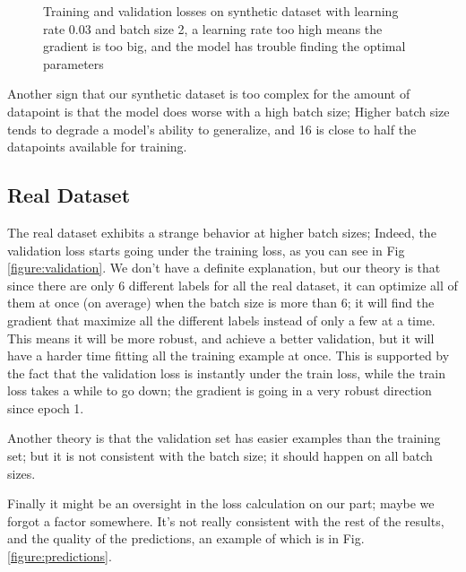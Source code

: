 \documentclass[10pt,conference]{IEEEtran}
\begin{document}
\begin{figure}[h]
\begin{minipage}[h]{0.23\textwidth}
    \caption{Training and validation losses on synthetic dataset with learning rate 0.03 and batch size 2, a learning rate too high means the gradient is too big, and the model has trouble finding the optimal parameters}
    \label{figure:highlr}
  \end{minipage}
\end{figure}

Another sign that our synthetic dataset is too complex for the amount of datapoint is that the model does worse with a high batch size; Higher batch size tends to degrade a model's ability to generalize, and 16 is close to half the datapoints available for training.
\subsection{Real Dataset}
The real dataset exhibits a strange behavior at higher batch sizes; Indeed, the validation loss starts going under the training loss, as you can see in Fig \ref{figure:validation}. We don't have a definite explanation, but our theory is that since there are only 6 different labels for all the real dataset, it can optimize all of them at once (on average) when the batch size is more than 6; it will find the gradient that maximize all the different labels instead of only a few at a time. This means it will be more robust, and achieve a better validation, but it will have a harder time fitting all the training example at once. This is supported by the fact that the validation loss is instantly under the train loss, while the train loss takes a while to go down; the gradient is going in a very robust direction since epoch 1.\par
Another theory is that the validation set has easier examples than the training set; but it is not consistent with the batch size; it should happen on all batch sizes.\par
Finally it might be an oversight in the loss calculation on our part; maybe we forgot a factor somewhere. It's not really consistent with the rest of the results, and the quality of the predictions, an example of which is in Fig. \ref{figure:predictions}.
\end{document}
